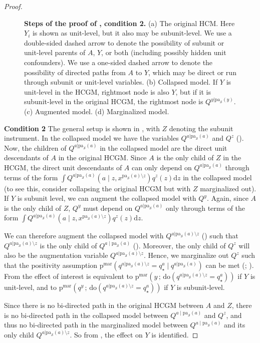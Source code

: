 \documentclass[12pt]{article}
\newcommand{\Sc}{\mathcal{S}}
\newcommand{\rmdo}{\mathrm{do}}
\newcommand{\s}{\, ; \,}
\newcommand{\di}{\mathrm{d}}
\newcommand{\pa}{\mathrm{pa}}
\newcommand{\pr}{\mathrm{p}}
\newcommand{\mar}{\mathrm{mar}}
\begin{document}
\begin{proof}
\begin{figure}[t]
\begin{subfigure}[t]{0.24\textwidth}
\begin{tikzpicture}
\end{tikzpicture}
\end{subfigure}
\caption{\textbf{Steps of the proof of , condition 2.} (a) The original HCM. Here $Y_i$ is shown as unit-level, but it also may be subunit-level. We use a double-sided dashed arrow to denote the possibility of subunit or unit-level parents of $A$, $Y$, or both (including possibly hidden unit confounders). We use a one-sided dashed arrow to denote the possibility of directed paths from $A$ to $Y$, which may be direct or run through subunit or unit-level variables. (b) Collapsed model. If $Y$ is unit-level in the HCGM, rightmost node is also $Y$, but if it is subunit-level in the original HCGM, the rightmost node is $Q^{y|\pa_\Sc(y)}$. (c) Augmented model. (d) Marginalized model.}
\end{figure} 
\textbf{Condition 2} The general setup is shown in , with $Z$ denoting the subunit instrument. In the collapsed model we have the variables $Q^{a | \pa_\Sc(a)}$ and $Q^z$ ().
Now, the children of $Q^{a | \pa_\Sc(a)}$ in the collapsed model are the direct unit descendants of $A$ in the original HCGM.
Since $A$ is the only child of $Z$ in the HCGM, the direct unit descendants of $A$ can only depend on $Q^{a | \pa_\Sc(a)}$ through terms of the form $\int Q^{a | \pa_\Sc(a)}(a \mid z, x^{\pa_\Sc(a)\setminus z}) q^z(z) \di z$ in the collapsed model (to see this, consider collapsing the original HCGM but with $Z$ marginalized out).
If $Y$ is subunit level, we can augment the collapsed model with $Q^y$. Again, since $A$ is the only child of $Z$, $Q^y$ must depend on $Q^{a | \pa_\Sc(a)}$ only through terms of the form $\int Q^{a | \pa_\Sc(a)}(a \mid z, x^{\pa_\Sc(a)\setminus z}) q^z(z) \di z$.


We can therefore augment the collapsed model with $Q^{a | \pa_\Sc(a)\setminus z}$ () such that $Q^{a | \pa_\Sc(a)\setminus z}$ is the only child of $Q^{a \mid \pa_\Sc(a)}$ ().
Moreover, the only child of $Q^z$ will also be the augmentation variable $Q^{a | \pa_\Sc(a)\setminus z}$.
Hence, we marginalize out $Q^z$ such that the positivity assumption $\pr^\mar(q^{a | \pa_\Sc(a)\setminus z} = q_\star^a \mid q^{a|\pa_\Sc(a)})$ can be met (; ).
From  the effect of interest is equivalent to $\pr^\mar(y \s \rmdo(q^{a | \pa_\Sc(a)\setminus z} = q_\star^a))$ if $Y$ is unit-level, and to $\pr^\mar(q^y \s \rmdo(q^{a | \pa_\Sc(a)\setminus z} = q_\star^a))$ if $Y$ is subunit-level.

Since there is no bi-directed path in the original HCGM between $A$ and $Z$, there is no bi-directed path in the collapsed model between $Q^{a \mid \pa_\Sc(a)}$ and $Q^z$, and thus no bi-directed path in the marginalized model between $Q^{a \mid \pa_\Sc(a)}$ and its only child $Q^{a | \pa_\Sc(a)\setminus z}$.
So from , the effect on $Y$ is identified.
\end{proof}
\end{document}
